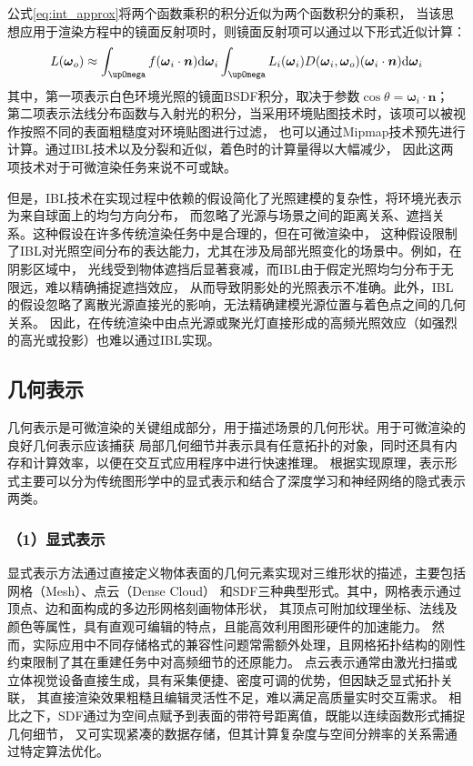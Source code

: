 公式\eqref{eq:int_approx}将两个函数乘积的积分近似为两个函数积分的乘积，
当该思想应用于渲染方程中的镜面反射项时，则镜面反射项可以通过以下形式近似计算：
\begin{equation}
  L({\boldsymbol{\omega}}_o)\approx 
  \int_{\upOmega}{f({\boldsymbol{\omega}}_i\cdot{\boldsymbol{n}}){\rm{d}}{\boldsymbol{\omega}}_i}
  \int_{\upOmega}{L_i({\boldsymbol{\omega}}_i)D({\boldsymbol{\omega}}_i,{\boldsymbol{\omega}}_o)({\boldsymbol{\omega}}_i\cdot{\boldsymbol{n}}){\rm{d}}{\boldsymbol{\omega}}_i}
  \label{eq:L_omega_o_approx}
\end{equation}
其中，第一项表示白色环境光照的镜面BSDF积分，取决于参数$\cos{\theta}={\boldsymbol{\omega}}_i\cdot{\boldsymbol{n}}；$
第二项表示法线分布函数与入射光的积分，当采用环境贴图技术时，该项可以被视作按照不同的表面粗糙度对环境贴图进行过滤，
也可以通过Mipmap技术\cite{williams_1983}预先进行计算。通过IBL技术以及分裂和近似，着色时的计算量得以大幅减少，
因此这两项技术对于可微渲染任务来说不可或缺。

但是，IBL技术在实现过程中依赖的假设简化了光照建模的复杂性，将环境光表示为来自球面上的均匀方向分布，
而忽略了光源与场景之间的距离关系、遮挡关系。这种假设在许多传统渲染任务中是合理的，但在可微渲染中，
这种假设限制了IBL对光照空间分布的表达能力，尤其在涉及局部光照变化的场景中。例如，在阴影区域中，
光线受到物体遮挡后显著衰减，而IBL由于假定光照均匀分布于无限远，难以精确捕捉遮挡效应，
从而导致阴影处的光照表示不准确。此外，IBL的假设忽略了离散光源直接光的影响，无法精确建模光源位置与着色点之间的几何关系。
因此，在传统渲染中由点光源或聚光灯直接形成的高频光照效应（如强烈的高光或投影）也难以通过IBL实现。

\subsection{几何表示} \label{sec:geo_representation}
几何表示是可微渲染的关键组成部分，用于描述场景的几何形状。用于可微渲染的良好几何表示应该捕获
局部几何细节并表示具有任意拓扑的对象，同时还具有内存和计算效率，以便在交互式应用程序中进行快速推理。
根据实现原理，表示形式主要可以分为传统图形学中的显式表示和结合了深度学习和神经网络的隐式表示两类。

\subsubsection*{（1）显式表示} 

显式表示方法通过直接定义物体表面的几何元素实现对三维形状的描述，主要包括网格（Mesh）、点云（Dense Cloud）
和SDF三种典型形式。其中，网格表示通过顶点、边和面构成的多边形网格刻画物体形状，
其顶点可附加纹理坐标、法线及颜色等属性，具有直观可编辑的特点，且能高效利用图形硬件的加速能力。
然而，实际应用中不同存储格式的兼容性问题常需额外处理，且网格拓扑结构的刚性约束限制了其在重建任务中对高频细节的还原能力。
点云表示通常由激光扫描或立体视觉设备直接生成，具有采集便捷、密度可调的优势，但因缺乏显式拓扑关联，
其直接渲染效果粗糙且编辑灵活性不足，难以满足高质量实时交互需求。
相比之下，SDF通过为空间点赋予到表面的带符号距离值，既能以连续函数形式捕捉几何细节，
又可实现紧凑的数据存储，但其计算复杂度与空间分辨率的关系需通过特定算法优化。

